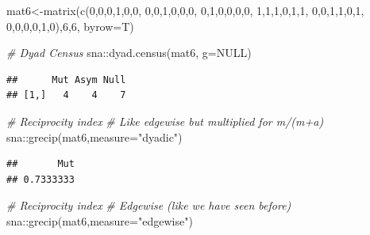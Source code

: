 \documentclass[
  notitlepage,
  onecolumn,
  openany]{book}
\newenvironment{Shaded}{\begin{snugshade}}{\end{snugshade}}
\newcommand{\AttributeTok}[1]{\textcolor[rgb]{0.77,0.63,0.00}{#1}}
\newcommand{\CommentTok}[1]{\textcolor[rgb]{0.56,0.35,0.01}{\textit{#1}}}
\newcommand{\ConstantTok}[1]{\textcolor[rgb]{0.00,0.00,0.00}{#1}}
\newcommand{\DecValTok}[1]{\textcolor[rgb]{0.00,0.00,0.81}{#1}}
\newcommand{\FunctionTok}[1]{\textcolor[rgb]{0.00,0.00,0.00}{#1}}
\newcommand{\NormalTok}[1]{#1}
\newcommand{\OtherTok}[1]{\textcolor[rgb]{0.56,0.35,0.01}{#1}}
\newcommand{\SpecialCharTok}[1]{\textcolor[rgb]{0.00,0.00,0.00}{#1}}
\newcommand{\StringTok}[1]{\textcolor[rgb]{0.31,0.60,0.02}{#1}}
\begin{document}
\begin{Shaded}
\begin{Highlighting}[]
\NormalTok{mat6}\OtherTok{\textless{}{-}}\FunctionTok{matrix}\NormalTok{(}\FunctionTok{c}\NormalTok{(}\DecValTok{0}\NormalTok{,}\DecValTok{0}\NormalTok{,}\DecValTok{0}\NormalTok{,}\DecValTok{1}\NormalTok{,}\DecValTok{0}\NormalTok{,}\DecValTok{0}\NormalTok{,}
               \DecValTok{0}\NormalTok{,}\DecValTok{0}\NormalTok{,}\DecValTok{1}\NormalTok{,}\DecValTok{0}\NormalTok{,}\DecValTok{0}\NormalTok{,}\DecValTok{0}\NormalTok{,}
               \DecValTok{0}\NormalTok{,}\DecValTok{1}\NormalTok{,}\DecValTok{0}\NormalTok{,}\DecValTok{0}\NormalTok{,}\DecValTok{0}\NormalTok{,}\DecValTok{0}\NormalTok{,}
               \DecValTok{1}\NormalTok{,}\DecValTok{1}\NormalTok{,}\DecValTok{1}\NormalTok{,}\DecValTok{0}\NormalTok{,}\DecValTok{1}\NormalTok{,}\DecValTok{1}\NormalTok{,}
               \DecValTok{0}\NormalTok{,}\DecValTok{0}\NormalTok{,}\DecValTok{1}\NormalTok{,}\DecValTok{1}\NormalTok{,}\DecValTok{0}\NormalTok{,}\DecValTok{1}\NormalTok{,}
               \DecValTok{0}\NormalTok{,}\DecValTok{0}\NormalTok{,}\DecValTok{0}\NormalTok{,}\DecValTok{0}\NormalTok{,}\DecValTok{1}\NormalTok{,}\DecValTok{0}\NormalTok{),}\DecValTok{6}\NormalTok{,}\DecValTok{6}\NormalTok{, }\AttributeTok{byrow=}\NormalTok{T)}

\CommentTok{\# Dyad Census}
\NormalTok{sna}\SpecialCharTok{::}\FunctionTok{dyad.census}\NormalTok{(mat6, }\AttributeTok{g=}\ConstantTok{NULL}\NormalTok{)}
\end{Highlighting}
\end{Shaded}

\begin{verbatim}
##      Mut Asym Null
## [1,]   4    4    7
\end{verbatim}

\begin{Shaded}
\begin{Highlighting}[]
\CommentTok{\# Reciprocity index}
\CommentTok{\# Like edgewise but multiplied for m/(m+a)}
\NormalTok{sna}\SpecialCharTok{::}\FunctionTok{grecip}\NormalTok{(mat6,}\AttributeTok{measure=}\StringTok{"dyadic"}\NormalTok{)}
\end{Highlighting}
\end{Shaded}

\begin{verbatim}
##       Mut 
## 0.7333333
\end{verbatim}

\begin{Shaded}
\begin{Highlighting}[]
\CommentTok{\# Reciprocity index}
\CommentTok{\# Edgewise (like we have seen before)}
\NormalTok{sna}\SpecialCharTok{::}\FunctionTok{grecip}\NormalTok{(mat6,}\AttributeTok{measure=}\StringTok{"edgewise"}\NormalTok{)}
\end{Highlighting}
\end{Shaded}
\end{document}

